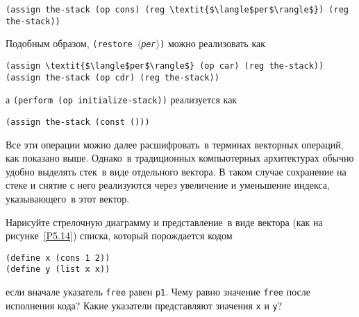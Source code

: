 \begin{Verbatim}[fontsize=\small]
(assign the-stack (op cons) (reg \textit{$\langle$рег$\rangle$}) (reg the-stack))
\end{Verbatim}
Подобным образом, {\tt (restore \textit{$\langle$рег$\rangle$})} можно
реализовать как

\begin{Verbatim}[fontsize=\small]
(assign \textit{$\langle$рег$\rangle$} (op car) (reg the-stack))
(assign the-stack (op cdr) (reg the-stack))
\end{Verbatim}
а {\tt (perform (op initialize-stack))} реализуется как

\begin{Verbatim}[fontsize=\small]
(assign the-stack (const ()))
\end{Verbatim}
Все эти операции можно далее расшифровать~в терминах векторных
операций, как показано выше.  Однако~в традиционных компьютерных
архитектурах обычно удобно выделять стек~в виде отдельного вектора.  В
таком случае сохранение на стеке и снятие с него реализуются через
увеличение и уменьшение индекса, указывающего~в этот вектор.
\begin{exercise}{5.20}%
\label{EX5.20}%
Нарисуйте стрелочную диаграмму и представление~в виде
вектора (как на рисунке~\ref{P5.14}) списка, который
порождается кодом

\begin{Verbatim}[fontsize=\small]
(define x (cons 1 2))
(define y (list x x))
\end{Verbatim}
если вначале указатель {\tt free} равен {\tt p1}. Чему
равно значение {\tt free} после исполнения кода? Какие
указатели представляют значения {\tt x} и {\tt y}?
\end{exercise}
